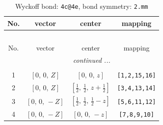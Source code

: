 \documentclass[fleqn,8pt]{jsarticle}
\begin{document}
\renewcommand{\arraystretch}{1.2}
\begin{longtable}{cccc}
\caption{Wyckoff bond: {\tt 4c@4e}, bond symmetry: {\tt 2.mm}}
 \\
 \hline \hline
No. & vector & center & mapping \\ \hline \endfirsthead

\multicolumn{3}{l}{\tablename\ \thetable{}} \\
 \hline \hline
No. & vector & center & mapping \\ \hline \endhead

 \hline \hline
\multicolumn{3}{r}{\footnotesize\it continued ...} \\ \endfoot

 \hline \hline
\multicolumn{3}{r}{} \\ \endlastfoot

1 & $\left[ 0,\, 0,\, Z \right]$ & $\left[ 0,\, 0,\, z \right]$ & {\tt [1,2,15,16]} \\ \hline
2 & $\left[ 0,\, 0,\, Z \right]$ & $\left[ \frac{1}{2},\, \frac{1}{2},\, z + \frac{1}{2} \right]$ & {\tt [3,4,13,14]} \\ \hline
3 & $\left[ 0,\, 0,\, - Z \right]$ & $\left[ \frac{1}{2},\, \frac{1}{2},\, \frac{1}{2} - z \right]$ & {\tt [5,6,11,12]} \\ \hline
4 & $\left[ 0,\, 0,\, - Z \right]$ & $\left[ 0,\, 0,\, - z \right]$ & {\tt [7,8,9,10]} \\
\end{longtable}
\renewcommand{\arraystretch}{1.2}
\end{document}
